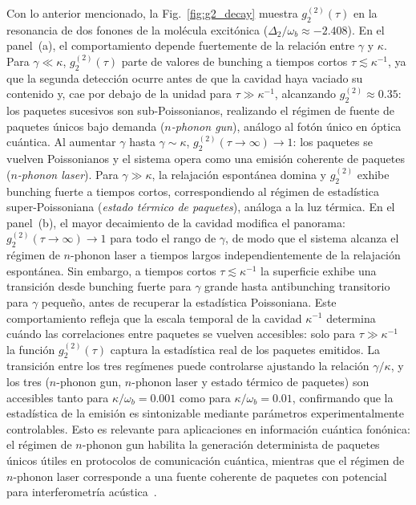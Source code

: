 Con lo anterior mencionado, la Fig.~\ref{fig:g2_decay} muestra $g_2^{(2)}(\tau)$ en la resonancia de dos fonones de la molécula excitónica ($\Delta_2/\omega_b \approx -2.408$). En el panel~(a), el comportamiento depende fuertemente de la relación entre $\gamma$ y $\kappa$. Para $\gamma \ll \kappa$, $g_2^{(2)}(\tau)$ parte de valores de bunching a tiempos cortos $\tau \lesssim \kappa^{-1}$, ya que la segunda detección ocurre antes de que la cavidad haya vaciado su contenido y, cae por debajo de la unidad para $\tau \gg \kappa^{-1}$, alcanzando $g_2^{(2)} \approx 0.35$: los paquetes sucesivos son sub-Poissonianos, realizando el régimen de fuente de paquetes únicos bajo demanda (\textit{$n$-phonon gun}), análogo al fotón único en óptica cuántica. Al aumentar $\gamma$ hasta $\gamma \sim \kappa$, $g_2^{(2)}(\tau\to\infty) \to 1$: los paquetes se vuelven Poissonianos y el sistema opera como una emisión coherente de paquetes (\textit{$n$-phonon laser}). Para $\gamma \gg \kappa$, la relajación espontánea domina y $g_2^{(2)}$ exhibe bunching fuerte a tiempos cortos, correspondiendo al régimen de estadística super-Poissoniana (\textit{estado térmico de paquetes}), análoga a la luz térmica. En el panel~(b), el mayor decaimiento de la cavidad modifica el panorama: $g_2^{(2)}(\tau\to\infty) \to 1$ para todo el rango de $\gamma$, de modo que el sistema alcanza el régimen de $n$-phonon laser a tiempos largos independientemente de la relajación espontánea. Sin embargo, a tiempos cortos $\tau \lesssim \kappa^{-1}$ la superficie exhibe una transición desde bunching fuerte para $\gamma$ grande hasta antibunching transitorio para $\gamma$ pequeño, antes de recuperar la estadística Poissoniana. Este comportamiento refleja que la escala temporal de la cavidad $\kappa^{-1}$ determina cuándo las correlaciones entre paquetes se vuelven accesibles: solo para $\tau \gg \kappa^{-1}$ la función $g_2^{(2)}(\tau)$ captura la estadística real de los paquetes emitidos. La transición entre los tres regímenes puede controlarse ajustando la relación $\gamma/\kappa$, y los tres ($n$-phonon gun, $n$-phonon laser y estado térmico de paquetes) son accesibles tanto para $\kappa/\omega_b = 0.001$ como para $\kappa/\omega_b = 0.01$, confirmando que la estadística de la emisión es sintonizable mediante parámetros experimentalmente controlables. Esto es relevante para aplicaciones en información cuántica fonónica: el régimen de $n$-phonon gun habilita la generación determinista de paquetes únicos útiles en protocolos de comunicación cuántica, mientras que el régimen de $n$-phonon laser corresponde a una fuente coherente de paquetes con potencial para interferometría acústica~\cite{bin2020}.

